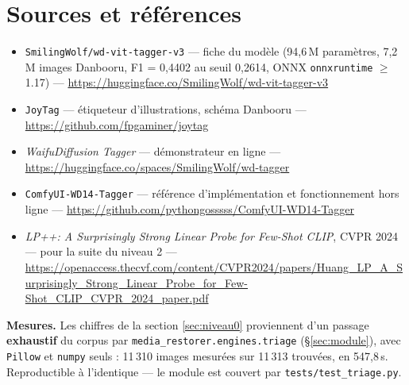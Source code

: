 \documentclass[11pt,a4paper]{article}
\newcommand{\modtriage}{\texttt{media\_restorer.\allowbreak engines.\allowbreak triage}}
\begin{document}
\section*{Sources et références}

\small\raggedright
\begin{itemize}[leftmargin=*,itemsep=3pt]
  \item \texttt{SmilingWolf/wd-vit-tagger-v3} — fiche du modèle (94,6\,M
  paramètres, 7,2\,M images Danbooru, F1 = 0,4402 au seuil 0,2614, ONNX
  \texttt{onnxruntime} $\geq$ 1.17) —
  \url{https://huggingface.co/SmilingWolf/wd-vit-tagger-v3}
  \item \texttt{JoyTag} — étiqueteur d'illustrations, schéma Danbooru —
  \url{https://github.com/fpgaminer/joytag}
  \item \emph{WaifuDiffusion Tagger} — démonstrateur en ligne —
  \url{https://huggingface.co/spaces/SmilingWolf/wd-tagger}
  \item \texttt{ComfyUI-WD14-Tagger} — référence d'implémentation et
  fonctionnement hors ligne —
  \url{https://github.com/pythongosssss/ComfyUI-WD14-Tagger}
  \item \emph{LP++: A Surprisingly Strong Linear Probe for Few-Shot CLIP},
  CVPR 2024 — pour la suite du niveau 2 —
  \url{https://openaccess.thecvf.com/content/CVPR2024/papers/Huang_LP_A_Surprisingly_Strong_Linear_Probe_for_Few-Shot_CLIP_CVPR_2024_paper.pdf}
\end{itemize}

\medskip
\textbf{Mesures.} Les chiffres de la section \ref{sec:niveau0} proviennent d'un
passage \textbf{exhaustif} du corpus par \modtriage{}
(§\ref{sec:module}), avec \texttt{Pillow} et \texttt{numpy} seuls :
11\,310 images mesurées sur 11\,313 trouvées, en 547,8\,s. Reproductible à
l'identique — le module est couvert par \texttt{tests/test\_triage.py}.
\end{document}
